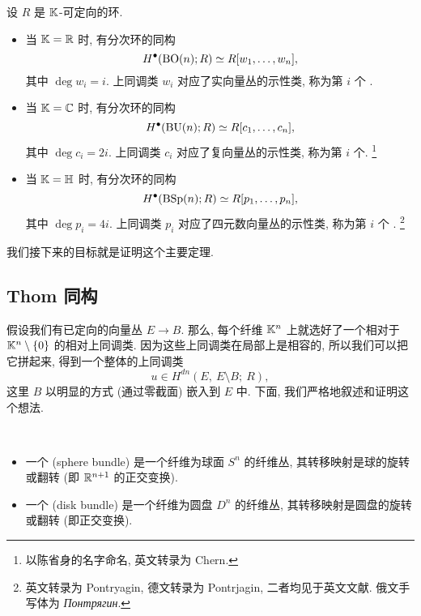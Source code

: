 \begin{theorem} \label{thm-2-main}
    设 $R$ 是 $\mathbb{K}$-可定向的环.
    \begin{itemize}
        \item 
            当 $\mathbb{K} = \mathbb{R}$ 时, 有分次环的同构
            \[ H^\bullet (\mathrm{B}\mathrm{O}(n); R) \simeq R[w_1, \dotsc, w_n], \]
            其中 $\deg w_i = i$. 
            上同调类 $w_i$ 对应了实向量丛的示性类,
            称为第 $i$ 个 . 
        \item 
            当 $\mathbb{K} = \mathbb{C}$ 时, 有分次环的同构
            \[ H^\bullet (\mathrm{B}\mathrm{U}(n); R) \simeq R[c_1, \dotsc, c_n], \]
            其中 $\deg c_i = 2i$. 
            上同调类 $c_i$ 对应了复向量丛的示性类,
            称为第 $i$ 个.%
                \footnote{以陈省身的名字命名, 英文转录为 Chern.} 
        \item 
            当 $\mathbb{K} = \mathbb{H}$ 时, 有分次环的同构
            \[ H^\bullet (\mathrm{B}\mathrm{Sp}(n); R) \simeq R[p_1, \dotsc, p_n], \]
            其中 $\deg p_i = 4i$. 
            上同调类 $p_i$ 对应了四元数向量丛的示性类,
            称为第 $i$ 个 .%
                \footnote{英文转录为 Pontryagin, 德文转录为 Pontrjagin, 二者均见于英文文献. 俄文手写体为 \textit{Понтрягин}.}
    \end{itemize}
\end{theorem}

我们接下来的目标就是证明这个主要定理.

\subsection{Thom 同构}

假设我们有已定向的向量丛 $E \to B$.
那么, 每个纤维 $\mathbb{K}^n$ 上就选好了一个相对于 $\mathbb{K}^n \setminus \{ 0 \}$
的相对上同调类. 因为这些上同调类在局部上是相容的,
所以我们可以把它拼起来, 得到一个整体的上同调类
\[ u \in H^{dn}(E,\ E \setminus B;\ R), \]
这里 $B$ 以明显的方式 (通过零截面) 嵌入到 $E$ 中.
下面, 我们严格地叙述和证明这个想法. 

\begin{definition}
    \ 
    \begin{itemize}[beginpenalty=10000]
        \item
            一个 (sphere bundle)
            是一个纤维为球面 $S^n$ 的纤维丛,
            其转移映射是球的旋转或翻转 (即 $\mathbb{R}^{n + 1}$ 的正交变换).
        \item
            一个 (disk bundle)
            是一个纤维为圆盘 $D^n$ 的纤维丛,
            其转移映射是圆盘的旋转或翻转 (即正交变换).
    \end{itemize}
\end{definition}

